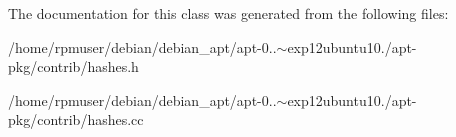 \-The documentation for this class was generated from the following files\-:\begin{DoxyCompactItemize}
\item 
/home/rpmuser/debian/debian\-\_\-apt/apt-\/0..$\sim$exp12ubuntu10./apt-\/pkg/contrib/hashes.\-h\item 
/home/rpmuser/debian/debian\-\_\-apt/apt-\/0..$\sim$exp12ubuntu10./apt-\/pkg/contrib/hashes.\-cc\end{DoxyCompactItemize}
